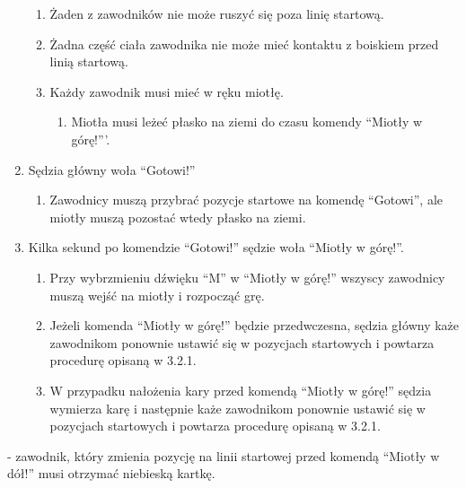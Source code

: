 \documentclass[12pt]{article}
\newcommand\bluecard{\bgroup\color{blue}\markoverwith{\textcolor{blue}{\rule[-0.5ex]{2pt}{0.4pt}}}\ULon}
\begin{document}
\begin{enumerate}
	      \begin{enumerate}
		      \item
		            Żaden z zawodników nie może ruszyć się poza linię startową.
		      \item
		            Żadna część ciała zawodnika nie może mieć kontaktu z boiskiem przed
		            linią startową.
		      \item
		            Każdy zawodnik musi mieć w ręku miotłę.

		            \begin{enumerate}
			            \item
			                  Miotła musi leżeć płasko na ziemi do czasu komendy ``Miotły w
			                  górę!'''.
		            \end{enumerate}
	      \end{enumerate}
	\item
	      Sędzia główny woła ``Gotowi!''

	      \begin{enumerate}
		      \item
		            Zawodnicy muszą przybrać pozycje startowe na komendę ``Gotowi'', ale
		            miotły muszą pozostać wtedy płasko na ziemi.
	      \end{enumerate}
	\item
	      Kilka sekund po komendzie ``Gotowi!'' sędzie woła ``Miotły w górę!''.

	      \begin{enumerate}
		      \item
		            Przy wybrzmieniu dźwięku ``M'' w ``Miotły w górę!'' wszyscy
		            zawodnicy muszą wejść na miotły i rozpocząć grę.
		      \item
		            Jeżeli komenda ``Miotły w górę!'' będzie przedwczesna, sędzia główny
		            każe zawodnikom ponownie ustawić się w pozycjach startowych i
		            powtarza procedurę opisaną w 3.2.1.
		      \item
		            W przypadku nałożenia kary przed komendą ``Miotły w górę!'' sędzia
		            wymierza karę i następnie każe zawodnikom ponownie ustawić się w
		            pozycjach startowych i powtarza procedurę opisaną w 3.2.1.
	      \end{enumerate}
\end{enumerate}

\bluecard{Niebieska kartka} - zawodnik, który zmienia pozycję na linii
startowej przed komendą ``Miotły w dół!'' musi otrzymać niebieską
kartkę.
\end{document}
